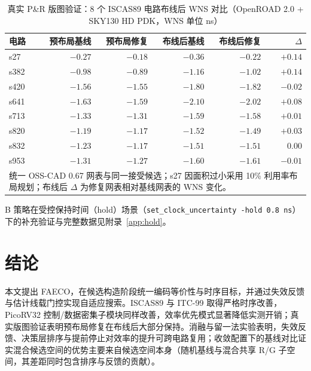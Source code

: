 \documentclass[journal]{IEEEtran}
\begin{document}
\begin{table}[!t]
\centering
\caption{真实 P\&R 版图验证：8 个 ISCAS89 电路布线后 WNS 对比（OpenROAD 2.0 + SKY130 HD PDK，WNS 单位 ns）}
\label{tab:pr8}
\footnotesize
\setlength{\tabcolsep}{2.5pt}
\begin{tabular}{lrrrrr}
\toprule
\textbf{电路} & \textbf{预布局基线} & \textbf{预布局修复} & \textbf{布线后基线} & \textbf{布线后修复} & $\Delta$ \\
\midrule
s27  & $-0.27$ & $-0.18$ & $-0.36$ & $-0.22$ & $+0.14$ \\
s382 & $-0.98$ & $-0.89$ & $-1.16$ & $-1.02$ & $+0.14$ \\
s420 & $-1.56$ & $-1.55$ & $-1.80$ & $-1.82$ & $-0.02$ \\
s641 & $-1.63$ & $-1.59$ & $-2.10$ & $-2.02$ & $+0.08$ \\
s713 & $-1.33$ & $-1.31$ & $-1.59$ & $-1.58$ & $+0.01$ \\
s820 & $-1.19$ & $-1.17$ & $-1.52$ & $-1.49$ & $+0.03$ \\
s832 & $-1.23$ & $-1.17$ & $-1.51$ & $-1.51$ & $0.00$ \\
s953 & $-1.31$ & $-1.27$ & $-1.60$ & $-1.61$ & $-0.01$ \\
\bottomrule
\multicolumn{6}{p{0.92\columnwidth}}{\footnotesize 统一 OSS-CAD 0.67 网表与同一接受候选；s27 因面积过小采用 10\% 利用率布局规划；布线后 $\Delta$ 为修复网表相对基线网表的 WNS 变化。}\\
\end{tabular}
\end{table}





B 策略在受控保持时间（hold）场景（\texttt{set\_clock\_uncertainty -hold 0.8\,ns}）下的补充验证与完整数据见附录~\ref{app:hold}。

\section{结论}\label{sec:conclusion}

本文提出 FAECO，在候选构造阶段统一编码等价性与时序目标，并通过失效反馈与估计线载门控实现自适应搜索。ISCAS89 与 ITC-99 取得严格时序改善，PicoRV32 控制/数据密集子模块同样改善，效率优先模式显著降低实测开销；真实版图验证表明预布局修复在布线后大部分保持。消融与留一法实验表明，失效反馈、决策层排序与提前停止对效率的提升可跨电路复用；收敛配置下的基线对比证实混合候选空间的优势主要来自候选空间本身（随机基线与混合共享 R/G 子空间，其差距同时包含排序与反馈的贡献）。
\end{document}
